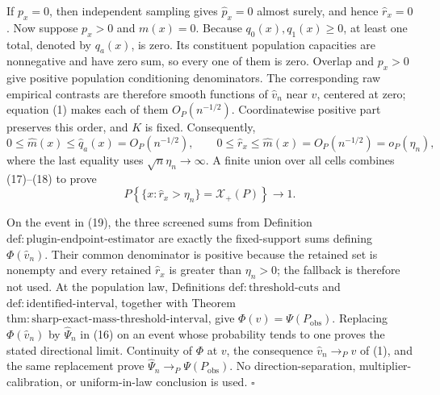 If \(p_x=0\), then independent sampling gives \(\widehat p_x=0\) almost surely, and hence \(\widehat r_x=0\).  Now suppose \(p_x>0\) and \(m(x)=0\).  Because \(q_0(x),q_1(x)\ge0\), at least one total, denoted by \(q_a(x)\), is zero.  Its constituent population capacities are nonnegative and have zero sum, so every one of them is zero.  Overlap and \(p_x>0\) give positive population conditioning denominators.  The corresponding raw empirical contrasts are therefore smooth functions of \(\widehat v_n\) near \(v\), centered at zero; equation (1) makes each of them \(O_P(n^{-1/2})\).  Coordinatewise positive part preserves this order, and \(K\) is fixed.  Consequently,
\[
0\le\widehat m(x)\le\widehat q_a(x)=O_P(n^{-1/2}),
\qquad
0\le\widehat r_x\le\widehat m(x)=O_P(n^{-1/2})=o_P(\eta_n),
\tag{18}
\]
where the last equality uses \(\sqrt n\eta_n\to\infty\).  A finite union over all cells combines (17)--(18) to prove
\[
P\!\left\{\{x:\widehat r_x>\eta_n\}=\mathcal X_+(P)\right\}\longrightarrow1.
\tag{19}
\]

On the event in (19), the three screened sums from Definition \(\mathrm{def{:}plugin\text{-}endpoint\text{-}estimator}\) are exactly the fixed-support sums defining \(\Phi(\widehat v_n)\).  Their common denominator is positive because the retained set is nonempty and every retained \(\widehat r_x\) is greater than \(\eta_n>0\); the fallback is therefore not used.  At the population law, Definitions \(\mathrm{def{:}threshold\text{-}cuts}\) and \(\mathrm{def{:}identified\text{-}interval}\), together with Theorem \(\mathrm{thm{:}sharp\text{-}exact\text{-}mass\text{-}threshold\text{-}interval}\), give \(\Phi(v)=\Psi(P_{\mathrm{obs}})\).  Replacing \(\Phi(\widehat v_n)\) by \(\widehat\Psi_n\) in (16) on an event whose probability tends to one proves the stated directional limit.  Continuity of \(\Phi\) at \(v\), the consequence \(\widehat v_n\to_Pv\) of (1), and the same replacement prove \(\widehat\Psi_n\to_P\Psi(P_{\mathrm{obs}})\).  No direction-separation, multiplier-calibration, or uniform-in-law conclusion is used. \(\square\)